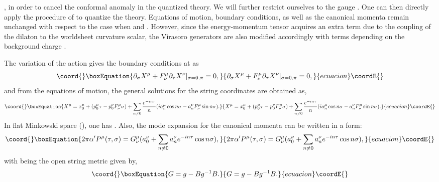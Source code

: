 \documentclass[a4paper,12pt]{article}
\begin{document}
\coordHE{}, in order to 
cancel the conformal anomaly in the quantized theory. 
We will further restrict ourselves to the gauge \coordHE{}.
One can then directly apply the
procedure of \cite{chu-ho} to quantize the theory. 
Equations of motion, boundary conditions, as well as the canonical 
momenta remain unchanged with respect to the case when 
\coordHE{} and \coordHE{}. However, since the energy-momentum tensor 
acquires an extra term due to the coupling of the dilaton to the 
worldsheet curvature scalar, the Virasoro generators are also 
modified accordingly with terms depending on the background charge 
\coordHE{}. 
 
The variation of the action gives the boundary conditions at \coordHE{} as 
\begin{equation}\coord{}\boxEquation{
\partial_{\sigma} X^{\mu} + F_{\nu}^{\mu} \partial_{\tau} X^{\nu}|_
{\sigma = 0, \pi} = 0,
\label{boundary}
}{
\partial_{\sigma} X^{\mu} + F_{\nu}^{\mu} \partial_{\tau} X^{\nu}|_
{\sigma = 0, \pi} = 0,
}{ecuacion}\coordE{}\end{equation}
and from the equations of motion, the general solutions for the string 
coordinates \coordHE{} are obtained as, 
\begin{equation}\coord{}\boxEquation{
X^{\mu} = x_0^{\mu} + (p_0^{\mu} \tau - p_0^{\nu} F_{\nu}^{\mu} \sigma) 
+ \sum_{n\neq 0}{e^{- i n \tau}\over n}
(i a^{\mu}_n \cos n\sigma - a^{\nu}_n F_{\nu}^{\mu} \sin n\sigma).
\label{mode}
}{
X^{\mu} = x_0^{\mu} + (p_0^{\mu} \tau - p_0^{\nu} F_{\nu}^{\mu} \sigma) 
+ \sum_{n\neq 0}{e^{- i n \tau}\over n}
(i a^{\mu}_n \cos n\sigma - a^{\nu}_n F_{\nu}^{\mu} \sin n\sigma).
}{ecuacion}\coordE{}\end{equation}
In flat Minkowski space (\coordHE{}), one has 
\coordHE{}. 
Also, the mode expansion for the canonical momenta 
can be written in a form: 
\begin{equation}\coord{}\boxEquation{
2\pi\alpha' P^{\mu}(\tau, \sigma) = G^{\mu}_{\nu}
(a_0^{\nu} + \sum_{n \neq 0} a_n^{\nu} e^{-i n \tau}
\cos n\sigma ),
}{
2\pi\alpha' P^{\mu}(\tau, \sigma) = G^{\mu}_{\nu}
(a_0^{\nu} + \sum_{n \neq 0} a_n^{\nu} e^{-i n \tau}
\cos n\sigma ),
}{ecuacion}\coordE{}\end{equation}
with \coordHE{} being the open string metric given by, 
\begin{equation}\coord{}\boxEquation{
G = g - B g^{-1} B.
}{
G = g - B g^{-1} B.
}{ecuacion}\coordE{}\end{equation}
\end{document}
